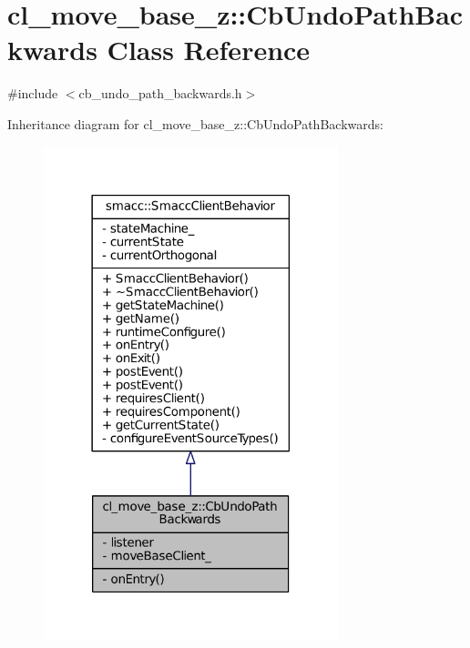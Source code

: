 \hypertarget{classcl__move__base__z_1_1CbUndoPathBackwards}{}\section{cl\+\_\+move\+\_\+base\+\_\+z\+:\+:Cb\+Undo\+Path\+Backwards Class Reference}
\label{classcl__move__base__z_1_1CbUndoPathBackwards}


{\ttfamily \#include $<$cb\+\_\+undo\+\_\+path\+\_\+backwards.\+h$>$}



Inheritance diagram for cl\+\_\+move\+\_\+base\+\_\+z\+:\+:Cb\+Undo\+Path\+Backwards\+:
\nopagebreak
\begin{figure}[H]
\begin{center}
\leavevmode
\includegraphics[width=242pt]{classcl__move__base__z_1_1CbUndoPathBackwards__inherit__graph}
\end{center}
\end{figure}


